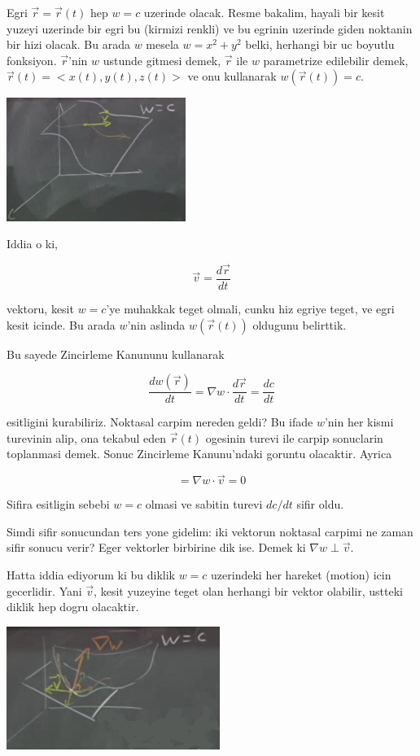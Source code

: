 \documentclass[12pt,fleqn]{article}\usepackage{../common}
\begin{document}
Egri $\vec{r} = \vec{r}(t)$ hep $w = c$ uzerinde olacak. Resme bakalim,
hayali bir kesit yuzeyi uzerinde bir egri bu (kirmizi renkli) ve bu egrinin
uzerinde giden noktanin bir hizi olacak. Bu arada $w$ mesela $w = x^2 +
y^2$ belki,
herhangi bir uc boyutlu fonksiyon. $\vec{r}$'nin $w$ ustunde gitmesi demek, $\vec{r}$ ile 
$w$ parametrize edilebilir demek, $\vec{r}(t)
= <x(t),y(t),z(t)>$ ve onu 
kullanarak $w(\vec{r}(t)) = c$.

\includegraphics[height=4cm]{12_3.png}

Iddia o ki, 

\[ \vec{v} = \frac{d\vec{r}}{dt} \]

vektoru, kesit $w = c$'ye muhakkak teget olmali, cunku hiz egriye teget, ve
egri kesit icinde. Bu arada $w$'nin aslinda $w(\vec{r}(t))$ oldugunu
belirttik.

Bu sayede Zincirleme Kanununu kullanarak 

\[ \frac{dw(\vec{r})}{dt} = \nabla w \cdot \frac{d\vec{r}}{dt} = \frac{dc}{dt}\]

esitligini kurabiliriz. Noktasal carpim nereden geldi? Bu ifade $w$'nin
her kismi turevinin alip, ona tekabul eden $\vec{r}(t)$ ogesinin turevi ile
carpip sonuclarin toplanmasi demek. Sonuc Zincirleme Kanunu'ndaki goruntu
olacaktir. Ayrica

\[  = \nabla w \cdot \vec{v} = 0\]

Sifira esitligin sebebi $w = c$ olmasi ve sabitin turevi $dc/dt$ sifir oldu. 

Simdi sifir sonucundan ters yone gidelim: iki vektorun noktasal carpimi ne
zaman sifir sonucu verir? Eger vektorler birbirine dik ise. Demek ki
$\nabla w \perp \vec{v}$.

Hatta iddia ediyorum ki bu diklik $w=c$ uzerindeki her hareket (motion)
icin gecerlidir. Yani $\vec{v}$, kesit yuzeyine teget olan herhangi bir
vektor olabilir, ustteki diklik hep dogru olacaktir.

\includegraphics[height=4cm]{12_4.png}
\end{document}
